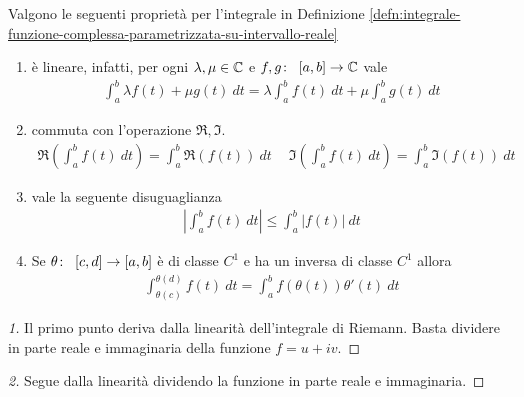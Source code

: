 \begin{proposition}
	\label{prop:proprieta-funzione-complessa-parametrizzata-su-intervallo-reale}
	Valgono le seguenti proprietà per l'integrale in Definizione \ref{defn:integrale-funzione-complessa-parametrizzata-su-intervallo-reale}
	\begin{enumerate}
		\item è lineare, infatti, per ogni $\lambda, \mu \in \mathbb{C}$ e $f,g \colon\ \left[a,b\right] \rightarrow \mathbb{C}$ vale
		\begin{equation*}
		\begin{aligned}
		\int_{a}^{b} \lambda f(t)  + \mu g(t)\ dt = \lambda \int_{a}^{b} f(t)\ dt + \mu \int_{a}^{b} g(t)\ dt   
		\end{aligned}
		\end{equation*}
		\item commuta con l'operazione $\Re, \Im$.
		\begin{equation*}
		\begin{aligned}	
		\Re\left(\int_{a}^{b} f(t)\ dt\right) = \int_{a}^{b} \Re(f(t))\ dt \quad\ \Im\left(\int_{a}^{b} f(t)\ dt\right) = \int_{a}^{b} \Im(f(t))\ dt
		\end{aligned}
		\end{equation*} 
		\item vale la seguente disuguaglianza
		\begin{equation*}
		\begin{aligned}
		\left|\int_{a}^{b} f(t)\ dt\right| \le \int_{a}^{b} |f(t)|\ dt
		\end{aligned}
		\end{equation*}
		\item Se $\theta \colon\ \left[c,d\right] \rightarrow \left[a,b\right]$ è di classe $C^1$ e ha un inversa di classe $C^1$ allora
		\begin{equation*}
		\begin{aligned}
		\int_{\theta(c)}^{\theta(d)} f(t)\ dt = \int_{a}^{b} f(\theta(t))\theta'(t)\ dt
		\end{aligned}
		\end{equation*}
	\end{enumerate} 
\end{proposition}
\begin{proof}[1]
	Il primo punto deriva dalla linearità dell'integrale di Riemann. 
	Basta dividere in parte reale e immaginaria della funzione $f = u+ iv$.
\end{proof}

\begin{proof}[2]
	Segue dalla linearità dividendo la funzione in parte reale e immaginaria.	
\end{proof}

